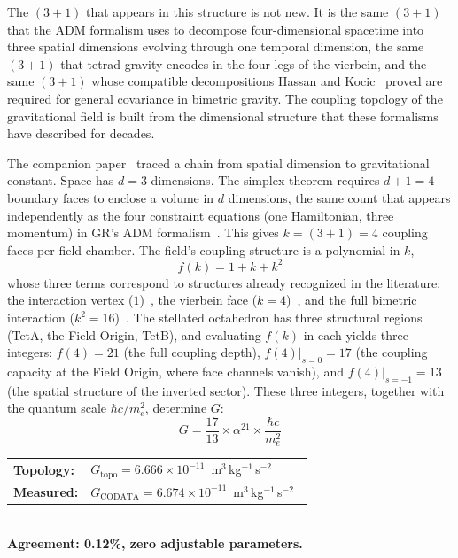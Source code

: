 \documentclass[aps,prd,preprint,superscriptaddress,showpacs,preprintnumbers,amsmath,amssymb,nofootinbib]{revtex4-2}
\begin{document}
The $(3{+}1)$ that appears in this structure is not new. It is the same $(3{+}1)$ that the ADM formalism uses to decompose four-dimensional spacetime into three spatial dimensions evolving through one temporal dimension, the same $(3{+}1)$ that tetrad gravity encodes in the four legs of the vierbein, and the same $(3{+}1)$ whose compatible decompositions Hassan and Kocic~\cite{hassankocic2018} proved are required for general covariance in bimetric gravity. The coupling topology of the gravitational field is built from the dimensional structure that these formalisms have described for decades.

The companion paper~\cite{paper6} traced a chain from spatial dimension to gravitational constant. Space has $d = 3$ dimensions. The simplex theorem requires $d + 1 = 4$ boundary faces to enclose a volume in $d$ dimensions, the same count that appears independently as the four constraint equations (one Hamiltonian, three momentum) in GR's ADM formalism~\cite{adm1962}. This gives $k = (3{+}1) = 4$ coupling faces per field chamber. The field's coupling structure is a polynomial in $k$,
\begin{equation}
f(k) = 1 + k + k^2
\end{equation}
whose three terms correspond to structures already recognized in the literature: the interaction vertex ($1$)~\cite{hinterbichler2012}, the vierbein face ($k = 4$)~\cite{mtw1973}, and the full bimetric interaction ($k^2 = 16$)~\cite{hassan2012}. The stellated octahedron has three structural regions (TetA, the Field Origin, TetB), and evaluating $f(k)$ in each yields three integers: $f(4) = 21$ (the full coupling depth), $f(4)|_{s=0} = 17$ (the coupling capacity at the Field Origin, where face channels vanish), and $f(4)|_{s=-1} = 13$ (the spatial structure of the inverted sector). These three integers, together with the quantum scale $\hbar c / m_e^2$, determine $G$:
\begin{equation}
G = \frac{17}{13} \times \alpha^{21} \times \frac{\hbar c}{m_e^2}
\label{eq:G}
\end{equation}
\begin{center}
\renewcommand{\arraystretch}{1.3}
\begin{tabular}{@{}ll@{}}
\textbf{Topology:} & $G_{\text{topo}} = 6.666 \times 10^{-11}$~m$^3$\,kg$^{-1}$\,s$^{-2}$ \\
\textbf{Measured:} & $G_{\text{CODATA}} = 6.674 \times 10^{-11}$~m$^3$\,kg$^{-1}$\,s$^{-2}$~\cite{codata2022} \\
\end{tabular}\\[4pt]
\textbf{Agreement: 0.12\%, zero adjustable parameters.}
\end{center}
\end{document}
